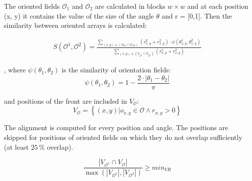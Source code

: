 The oriented fields $ \mathcal{O}_1 $ and $ \mathcal{O}_2 $ are calculated in blocks $w \times w$ and at each position (x, y) it contains the value of the size of the angle $ \theta $ and r = [0,1]. Then the similarity between oriented arrays is calculated: \cite{morphing_paper} 	

\begin{equation}
\begin{split}
S\left(\mathcal{O}^{1}, \mathcal{O}^{2}\right)=
\frac{\sum_{(x, y) \in\left(V_{\mathcal{O} 1} \cap V_{\mathcal{O} 2}\right)}\left(r_{x, y}^{y}+r_{x, y}^{2}\right) \cdot \psi\left(\theta_{x, y}^{1}, \theta_{x, y}^{2}\right)}{\sum_{(x, y) \in\left(V_{\mathcal{O}^{1}} \cap V_{\mathcal{O}^{2}}\right)}\left(r_{x, y}^{1}+r_{x, y}^{2}\right)}
\end{split}
\end{equation}

, where $\psi\left(\theta_{1}, \theta_{2}\right) $ is the similarity of orientation fields:
\begin{equation}
\psi\left(\theta_{1}, \theta_{2}\right)=1-\frac{2 \cdot\left|\theta_{1}-\theta_{2}\right|}{\pi}
\end{equation}

and positions of the front are included in $V_{\mathcal{O}}$: \cite{morphing_paper}
\begin{equation}
V_{\mathcal{O}}=\left\{(x, y) | o_{x, y} \in \mathcal{O} \wedge r_{x, y}>0\right\}
\end{equation}

The alignment is computed for every position and angle. The positions are skipped for positions of oriented fields on which they do not overlap sufficiently (at least $25\,\%$ overlap). \cite{morphing_paper}

\begin{equation}
\frac{\left|V_{\mathcal{O}^{1}} \cap V_{\mathcal{O}}\right|}{\max \left(\left|V_{\mathcal{O}^{1} }\right|, | V_{\mathcal{O}^{2} }|\right)} \geq min_{V R}
\end{equation}

